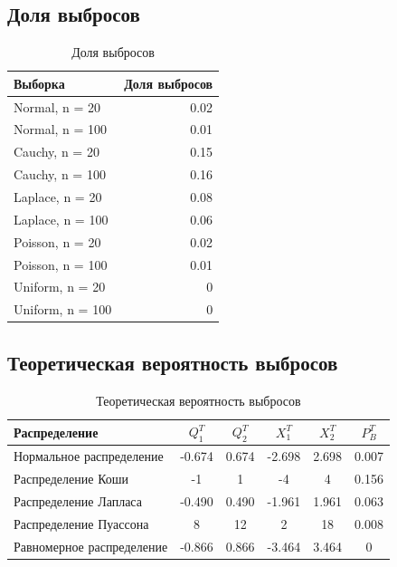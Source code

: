 \documentclass[../body.tex]{subfiles}
\begin{document}
\subsection{Доля выбросов}
\begin{table}[H]
	\centering
	\begin{tabular}{lr}
		\hline
		Выборка          &   Доля выбросов \\
		\hline
		Normal, n = 20   &            0.02 \\
		Normal, n = 100  &            0.01 \\
		Cauchy, n = 20   &            0.15 \\
		Cauchy, n = 100  &            0.16 \\
		Laplace, n = 20  &            0.08 \\
		Laplace, n = 100 &            0.06 \\
		Poisson, n = 20  &            0.02 \\
		Poisson, n = 100 &            0.01 \\
		Uniform, n = 20  &            0    \\
		Uniform, n = 100 &            0    \\
		\hline
	\end{tabular}
	\caption{Доля выбросов}
	\label{tab:outliers}
\end{table}

\subsection{Теоретическая вероятность выбросов}
\begin{table}[H]
	\begin{center}
		\begin{tabular}{ l  c  c  c  c  c }
			\hline
			Распределение    & $Q_1^T$ & $Q_2^T$ & $X_1^T$ & $X_2^T$ & $P_B^T$ \\ \hline
			Нормальное распределение & -0.674 & 0.674 & -2.698 & 2.698 & 0.007 \\ 
			Распределение Коши & -1 & 1 & -4 & 4 & 0.156 \\ 
			Распределение Лапласа & -0.490 & 0.490 & -1.961 & 1.961 & 0.063 \\ 
			Распределение Пуассона & 8 & 12 & 2 & 18 & 0.008 \\ 
			Равномерное распределение & -0.866 & 0.866 & -3.464 & 3.464 & 0 \\   \hline
		\end{tabular}
		\caption{Теоретическая вероятность выбросов}
		\label{tab:theor}
	\end{center}
\end{table}
\end{document}

